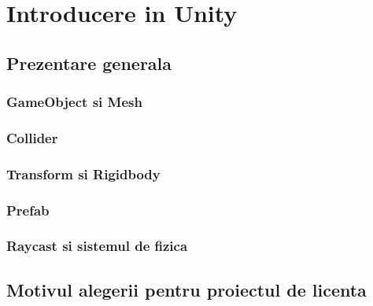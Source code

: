 \documentclass[12pt, a4paper]{article}
\begin{document}
	
	
	\section{Introducere in Unity}
	
	
	
	
	
	\subsection{Prezentare generala}
	
	
	
	
	
	\subsubsection{GameObject si Mesh}
	
	
	
	
	
	\subsubsection{Collider}
	
	
	
	
	
	\subsubsection{Transform si Rigidbody}
	
	
	
	
	\subsubsection{Prefab}
	
	
	
	
	
	\subsubsection{Raycast si sistemul de fizica}
	
	
	
	
	
	\subsection{Motivul alegerii pentru proiectul de licenta}
\end{document}

